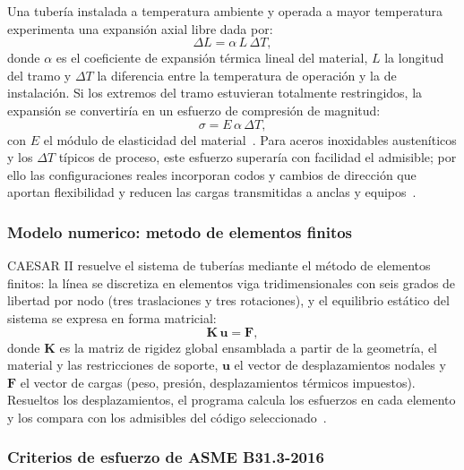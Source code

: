 Una tuber\'{i}a instalada a temperatura ambiente y operada a mayor temperatura
experimenta una expansi\'{o}n axial libre dada por:
\begin{equation}
    \Delta L = \alpha \, L \, \Delta T,
    \label{eq:expansion}
\end{equation}
donde $\alpha$ es el coeficiente de expansi\'{o}n t\'{e}rmica lineal del material,
$L$ la longitud del tramo y $\Delta T$ la diferencia entre la temperatura de
operaci\'{o}n y la de instalaci\'{o}n. Si los extremos del tramo estuvieran
totalmente restringidos, la expansi\'{o}n se convertir\'{i}a en un esfuerzo de
compresi\'{o}n de magnitud:
\begin{equation}
    \sigma = E \, \alpha \, \Delta T,
    \label{eq:esfuerzo_termico}
\end{equation}
con $E$ el m\'{o}dulo de elasticidad del material~\cite{toolbox_thermal_stress}. Para aceros inoxidables
austen\'{i}ticos y los $\Delta T$ t\'{i}picos de proceso, este esfuerzo superar\'{i}a
con facilidad el admisible; por ello las configuraciones reales incorporan codos
y cambios de direcci\'{o}n que aportan flexibilidad y reducen las cargas
transmitidas a anclas y equipos~\cite{peng_pipe_stress}.

\subsubsection{Modelo numerico: metodo de elementos finitos}

CAESAR II resuelve el sistema de tuber\'{i}as mediante el m\'{e}todo de elementos
finitos: la l\'{i}nea se discretiza en elementos viga tridimensionales con seis
grados de libertad por nodo (tres traslaciones y tres rotaciones), y el equilibrio
est\'{a}tico del sistema se expresa en forma matricial:
\begin{equation}
    \mathbf{K} \, \mathbf{u} = \mathbf{F},
    \label{eq:fem}
\end{equation}
donde $\mathbf{K}$ es la matriz de rigidez global ensamblada a partir de la
geometr\'{i}a, el material y las restricciones de soporte, $\mathbf{u}$ el vector
de desplazamientos nodales y $\mathbf{F}$ el vector de cargas (peso, presi\'{o}n,
desplazamientos t\'{e}rmicos impuestos). Resueltos los desplazamientos, el
programa calcula los esfuerzos en cada elemento y los compara con los
admisibles del c\'{o}digo seleccionado~\cite{caesar2_ug_2019}.

\subsubsection{Criterios de esfuerzo de ASME B31.3-2016}

